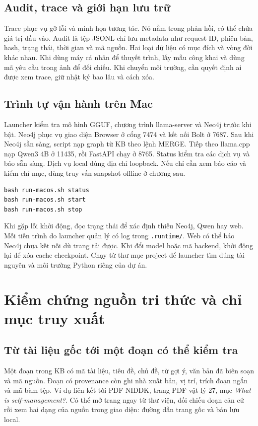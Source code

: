 \section{Audit, trace và giới hạn lưu trữ}
Trace phục vụ gỡ lỗi và minh họa tương tác. Nó nằm trong phản hồi, có thể chứa giá trị đầu vào. Audit là tệp JSONL chỉ lưu metadata như request ID, phiên bản, hash, trạng thái, thời gian và mã nguồn. Hai loại dữ liệu có mục đích và vòng đời khác nhau. Khi dùng máy cá nhân để thuyết trình, lấy mẫu công khai và dùng mã yêu cầu trong ảnh để đối chiếu. Khi chuyển môi trường, cần quyết định ai được xem trace, giữ nhật ký bao lâu và cách xóa.

\section{Trình tự vận hành trên Mac}
Launcher kiểm tra mô hình GGUF, chương trình llama-server và Neo4j trước khi bật. Neo4j phục vụ giao diện Browser ở cổng 7474 và kết nối Bolt ở 7687. Sau khi Neo4j sẵn sàng, script nạp graph từ KB theo lệnh MERGE. Tiếp theo llama.cpp nạp Qwen3 4B ở 11435, rồi FastAPI chạy ở 8765. Status kiểm tra các dịch vụ và báo sẵn sàng. Dịch vụ local dùng địa chỉ loopback. Nếu chỉ cần xem báo cáo và kiểm chỉ mục, dùng truy vấn snapshot offline ở chương sau.

\begin{Verbatim}[fontsize=\small]
bash run-macos.sh status
bash run-macos.sh start
bash run-macos.sh stop
\end{Verbatim}

Khi gặp lỗi khởi động, đọc trạng thái để xác định thiếu Neo4j, Qwen hay web. Mỗi tiến trình do launcher quản lý có log trong \nolinkurl{.runtime/}. Web có thể báo Neo4j chưa kết nối dù trang tải được. Khi đổi model hoặc mã backend, khởi động lại để xóa cache checkpoint. Chạy từ thư mục project để launcher tìm đúng tài nguyên và môi trường Python riêng của dự án.

\chapter{Kiểm chứng nguồn tri thức và chỉ mục truy xuất}\label{pr:source-audit}

\section{Từ tài liệu gốc tới một đoạn có thể kiểm tra}
Một đoạn trong KB có mã tài liệu, tiêu đề, chủ đề, từ gợi ý, văn bản đã biên soạn và mã nguồn. Đoạn có provenance còn ghi nhà xuất bản, vị trí, trích đoạn ngắn và mã băm tệp. Ví dụ  liên kết tới PDF NIDDK, trang PDF vật lý 27, mục \emph{What is self-management?}. Có thể mở trang ngay từ thư viện, đối chiếu đoạn căn cứ rồi xem hai dạng của nguồn trong giao diện: đường dẫn trang gốc và bản lưu local.

